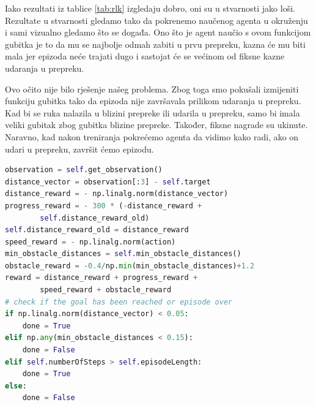 \documentclass[times,utf8,diplomski]{fer}
\begin{document}
\vspace{10pt}

Iako rezultati iz tablice \ref{tab:rlk} izgledaju dobro, oni su u stvarnosti jako loši. Rezultate u stvarnosti gledamo tako da pokrenemo naučenog agenta u okruženju i sami vizualno gledamo što se događa. Ono što je agent naučio s ovom funkcijom gubitka je to da mu se najbolje odmah zabiti u prvu prepreku, kazna će mu biti mala jer epizoda neće trajati dugo i sastojat će se većinom od fiksne kazne udaranja u prepreku. 

Ovo očito nije bilo rješenje našeg problema. Zbog toga smo pokušali izmijeniti funkciju gubitka tako da epizoda nije završavala prilikom udaranja u prepreku. Kad bi se ruka nalazila u blizini prepreke ili udarila u prepreku, samo bi imala veliki gubitak zbog gubitka blizine prepreke. Također, fiksne nagrade su ukinute. Naravno, kad nakon treniranja pokrećemo agenta da vidimo kako radi, ako on udari u prepreku, završit ćemo epizodu.

\begin{lstlisting}[caption={Kod za linearno kažnjavanje blizine i bez završavanja prilikom udarca u prepreku},language=Python]
observation = self.get_observation()
distance_vector = observation[:3] - self.target
distance_reward = - np.linalg.norm(distance_vector)
progress_reward = - 300 * (-distance_reward +
		self.distance_reward_old)
self.distance_reward_old = distance_reward
speed_reward = - np.linalg.norm(action)
min_obstacle_distances = self.min_obstacle_distances()
obstacle_reward = -0.4/np.min(min_obstacle_distances)+1.2
reward = distance_reward + progress_reward +
		speed_reward + obstacle_reward
# check if the goal has been reached or episode over
if np.linalg.norm(distance_vector) < 0.05:
    done = True
elif np.any(min_obstacle_distances < 0.15):
    done = False
elif self.numberOfSteps > self.episodeLength:
    done = True
else:
    done = False
\end{lstlisting}
\end{document}
